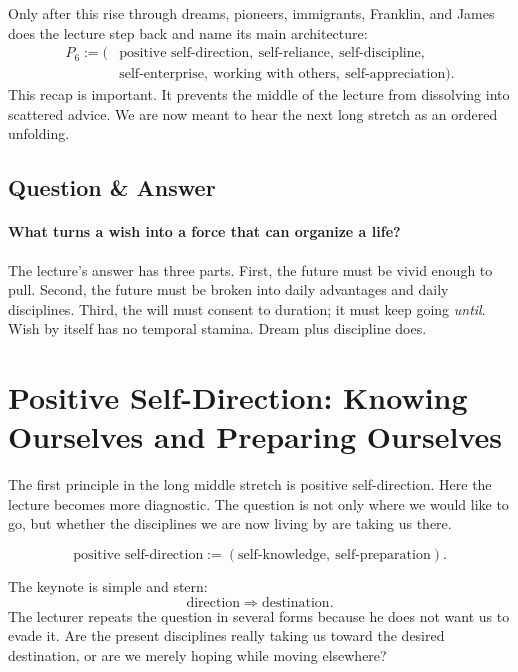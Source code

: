 Only after this rise through dreams, pioneers, immigrants, Franklin, and James does the lecture step back and name its main architecture:
\begin{align}
P_6 := (&\text{positive self-direction},\ \text{self-reliance},\ \text{self-discipline}, \nonumber\\
&\text{self-enterprise},\ \text{working with others},\ \text{self-appreciation}).
\end{align}
This recap is important. It prevents the middle of the lecture from dissolving into scattered advice. We are now meant to hear the next long stretch as an ordered unfolding.

\subsection{Question \& Answer}

\paragraph{What turns a wish into a force that can organize a life?}
The lecture's answer has three parts. First, the future must be vivid enough to pull. Second, the future must be broken into daily advantages and daily disciplines. Third, the will must consent to duration; it must keep going \emph{until}. Wish by itself has no temporal stamina. Dream plus discipline does.

\section{Positive Self-Direction: Knowing Ourselves and Preparing Ourselves}

The first principle in the long middle stretch is positive self-direction. Here the lecture becomes more diagnostic. The question is not only where we would like to go, but whether the disciplines we are now living by are taking us there.

\begin{equation}
\text{positive self-direction} := (\text{self-knowledge},\ \text{self-preparation}).
\end{equation}

The keynote is simple and stern:
\begin{equation}
\text{direction} \Rightarrow \text{destination}.
\end{equation}
The lecturer repeats the question in several forms because he does not want us to evade it. Are the present disciplines really taking us toward the desired destination, or are we merely hoping while moving elsewhere?

